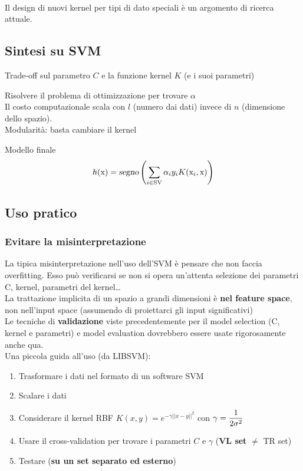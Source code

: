 \documentclass[10pt]{book}
\begin{document}
\paragraph{} Il design di nuovi kernel per tipi di dato speciali è un argomento di ricerca attuale.
\subsection{Sintesi su SVM}
\begin{list}{}{}
	\item Trade-off sul parametro $C$ e la funzione kernel $K$ (e i suoi parametri)
	\item Risolvere il problema di ottimizzazione per trovare $\alpha$\\
	Il costo computazionale scala con $l$ (numero dai dati) invece di $n$ (dimensione dello spazio).\\
	Modularità: basta cambiare il kernel
	\item Modello finale
	$$h(\text{x}) = \textsl{segno}\left(\sum_{i\in \text{SV}} \alpha_i y_i K(\text{x}_i, \text{x}) \right)$$
\end{list}
\subsection{Uso pratico}
\subsubsection{Evitare la misinterpretazione}
La tipica misinterpretazione nell'uso dell'SVM è pensare che non faccia overfitting. Esso può verificarsi se non si opera un'attenta selezione dei parametri C, kernel, parametri del kernel\ldots\\
La trattazione implicita di un spazio a grandi dimensioni è \textbf{nel feature space}, non nell'input space (assumendo di proiettarci gli input significativi)\\
Le tecniche di \textbf{validazione} viste precedentemente per il model selection (C, kernel e parametri) e model evaluation dovrebbero essere usate rigorosamente anche qua.\\
Una piccola guida all'uso (da LIBSVM):
\begin{enumerate}
	\item Trasformare i dati nel formato di un software SVM
	\item Scalare i dati
	\item Considerare il kernel RBF $K(x, y) = e^{-\gamma||x-y||^2}$ con $\gamma = \mathlarger{\frac{1}{2\sigma^2}}$
	\item Usare il cross-validation per trovare i parametri $C$ e $\gamma$ (\textbf{VL set} $\neq$ TR set)
	\item Testare (\textbf{su un set separato ed esterno})
\end{enumerate}
\end{document}
